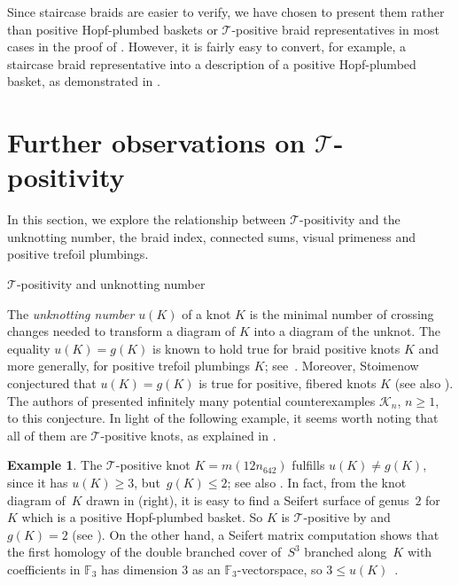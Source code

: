 \documentclass{amsart}
\makeatletter
\renewcommand\subsection{\@startsection{subsection}{2}%
  \z@{-.5\linespacing\@plus-.7\linespacing}{.5\linespacing}%
  {\normalfont\scshape}}
\theoremstyle{definition}
\newtheorem{example}[definition]{Example}
\theoremstyle{remark}
\theoremstyle{plain}
\newcommand{\F}{\mathbb{F}}
\newcommand{\T}{\mathcal{T}}
\makeatother
\begin{document}
Since staircase braids are easier to verify, we have chosen to present them rather than positive Hopf-plumbed baskets or $\T$-positive braid representatives in most cases in the proof of . However, it is fairly easy to convert, for example, a staircase braid representative into a description of a positive Hopf-plumbed basket, as demonstrated in \cite[Lemma~5.5]{banfield}.


\section{Further observations on \texorpdfstring{$\T$-positivity}{T-positivity}}\label{sec:further_results}

In this section, we explore the relationship between $\T$-positivity and the unknotting number, the braid index, connected sums, visual primeness and positive trefoil plumbings. 

\subsection{\texorpdfstring{$\T$-positivity}{T-positivity} and unknotting number}

The \emph{unknotting number} $u(K)$ of a knot $K$ is the minimal number of crossing changes needed to transform a diagram of $K$ into a diagram of the unknot. The equality $u(K) = g(K)$ is known to hold true for braid positive knots $K$ and more generally, for positive trefoil plumbings $K$; see~\cite{rudolph_braidedsurfaces,BD:trefoil_plumbing,kegel2024unknottingfiberedpositiveknots}. Moreover, Stoimenow~\cite[Conjecture~4.1]{stoimenow} conjectured that $u(K)=g(K)$ is true for positive, fibered knots $K$ (see also \cite[Conjecture~5]{murasugi-Przytycki}). The authors of \cite{kegel2024unknottingfiberedpositiveknots} presented infinitely many potential counterexamples $\mathcal{K}_n$, $n \geq 1$, to this conjecture. In light of the following example, it seems worth noting that all of them are $\T$-positive knots, as explained in . 

\begin{example}
The $\T$-positive knot $K = m(12n_{642})$ fulfills $u(K) \neq g(K)$, since it has $u(K) \geq 3$, but~$g(K) \leq 2$; see also \cite{knotinfo}. In fact, from the knot diagram of~$K$ drawn in  (right), it is easy to find a Seifert surface of genus~$2$ for~$K$ which is a positive Hopf-plumbed basket. So $K$ is $\T$-positive by  and~$g(K)=2$ (see ). On the other hand, a Seifert matrix computation shows that the first homology of the double branched cover of~$S^3$ branched along~$K$ with coefficients in $\F_3$ has dimension $3$ as an $\F_3$-vectorspace, so $3 \leq u(K)$~\cite{Wendt1937}.
\end{example}
\end{document}
